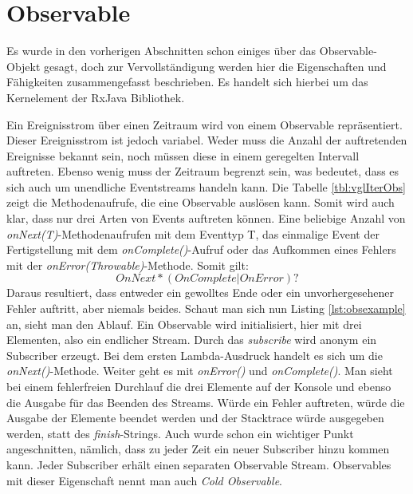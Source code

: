 \section{Observable}
Es wurde in den vorherigen Abschnitten schon einiges über das Observable-Objekt gesagt, doch zur Vervollständigung werden hier die Eigenschaften und Fähigkeiten zusammengefasst beschrieben. Es handelt sich hierbei um das Kernelement der RxJava Bibliothek.

Ein Ereignisstrom über einen Zeitraum wird von einem Observable repräsentiert. Dieser Ereignisstrom ist jedoch variabel. Weder muss die Anzahl der auftretenden Ereignisse bekannt sein, noch müssen diese in einem geregelten Intervall auftreten. Ebenso wenig muss der Zeitraum begrenzt sein, was bedeutet, dass es sich auch um unendliche Eventstreams handeln kann. Die Tabelle \ref{tbl:vglIterObs} zeigt die Methodenaufrufe, die eine Observable auslösen kann. Somit wird auch klar, dass nur drei Arten von Events auftreten können. Eine beliebige Anzahl von \textit{onNext(T)}-Methodenaufrufen mit dem Eventtyp T, das einmalige Event der Fertigstellung mit dem \textit{onComplete()}-Aufruf oder das Aufkommen eines Fehlers mit der \textit{onError(Throwable)}-Methode. Somit gilt: 
\begin{displaymath}
	OnNext*(OnComplete | OnError)?
\end{displaymath}
Daraus resultiert, dass entweder ein gewolltes Ende oder ein unvorhergesehener Fehler auftritt, aber niemals beides. Schaut man sich nun Listing \ref{lst:obsexample} an, sieht man den Ablauf. Ein Observable wird initialisiert, hier mit drei Elementen, also ein endlicher Stream. Durch das \textit{subscribe} wird anonym ein Subscriber erzeugt. Bei dem ersten Lambda-Ausdruck handelt es sich um die \textit{onNext()}-Methode. Weiter geht es mit \textit{onError()} und \textit{onComplete()}. Man sieht bei einem fehlerfreien Durchlauf die drei Elemente auf der Konsole und ebenso die Ausgabe für das Beenden des Streams. Würde ein Fehler auftreten, würde die Ausgabe der Elemente beendet werden und der Stacktrace würde ausgegeben werden, statt des \textit{finish}-Strings. Auch wurde schon ein wichtiger Punkt angeschnitten, nämlich, dass zu jeder Zeit ein neuer Subscriber hinzu kommen kann. Jeder Subscriber erhält einen separaten Observable Stream. Observables mit dieser Eigenschaft nennt man auch \textit{Cold Observable}.

